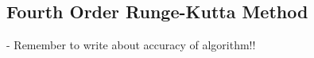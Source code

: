 \subsection{Fourth Order Runge-Kutta Method}
\label{sec:methodRK4}
- Remember to write about accuracy of algorithm!!